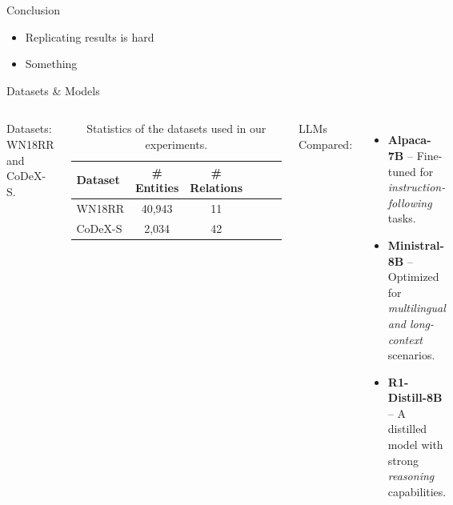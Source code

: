 \documentclass[aspectratio=169,xcolor=dvipsnames]{beamer}
\newcommand{\backupbegin}{
    \newcounter{finalframe}
    \setcounter{finalframe}{\value{framenumber}}
}
\newcommand{\modelministral}{Ministral-8B\xspace}
\newcommand{\modelalpaca}{Alpaca-7B\xspace}
\newcommand{\modeldeepseek}{R1-Distill-8B\xspace}
\begin{document}


\begin{frame}{Conclusion}

    \begin{itemize}
        \item Replicating results is hard
        \item Something
    \end{itemize}
\end{frame}

%    
%    

\backupbegin
\begin{frame}{Datasets \& Models}
    \begin{columns}[c]
        Datasets: WN18RR and CoDeX-S.
        \begin{table}[h]
            \centering
            \begin{tabular}{l c c c c c}
                \toprule
                \textbf{Dataset} & \textbf{\# Entities} & \textbf{\# Relations} \\
                \midrule
                WN18RR           & 40,943               & 11                    \\
                CoDeX-S          & 2,034                & 42                    \\
                \bottomrule
            \end{tabular}
            \caption{Statistics of the datasets used in our experiments.}
            \label{tab:datasets}
        \end{table}

        LLMs Compared:
        \begin{itemize}
            \item \textbf{\modelalpaca} – Fine-tuned for \textit{instruction-following} tasks.
            \item \textbf{\modelministral} – Optimized for \textit{multilingual and long-context} scenarios.
            \item \textbf{\modeldeepseek} – A distilled model with strong \textit{reasoning} capabilities.
        \end{itemize}
    \end{columns}
\end{frame}
\end{document}
